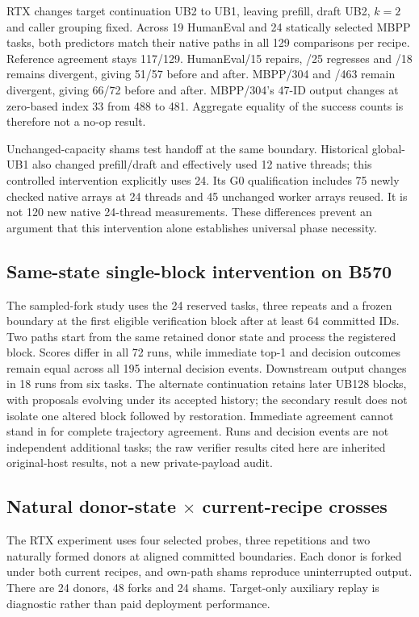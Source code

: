 RTX changes target continuation UB2 to UB1, leaving prefill, draft UB2, $k=2$ and caller grouping fixed. Across 19 HumanEval and 24 statically selected MBPP tasks, both predictors match their native paths in all 129 comparisons per recipe. Reference agreement stays 117/129. HumanEval/15 repairs, /25 regresses and /18 remains divergent, giving 51/57 before and after. MBPP/304 and /463 remain divergent, giving 66/72 before and after. MBPP/304's 47-ID output changes at zero-based index 33 from 488 to 481. Aggregate equality of the success counts is therefore not a no-op result.

Unchanged-capacity shams test handoff at the same boundary. Historical global-UB1 also changed prefill/draft and effectively used 12 native threads; this controlled intervention explicitly uses 24. Its G0 qualification includes 75 newly checked native arrays at 24 threads and 45 unchanged worker arrays reused. It is not 120 new native 24-thread measurements. These differences prevent an argument that this intervention alone establishes universal phase necessity.

\subsection{Same-state single-block intervention on B570}
\label{supp:b570_single_block}
The sampled-fork study uses the 24 reserved tasks, three repeats and a frozen boundary at the first eligible verification block after at least 64 committed IDs. Two paths start from the same retained donor state and process the registered block. Scores differ in all 72 runs, while immediate top-1 and decision outcomes remain equal across all 195 internal decision events. Downstream output changes in 18 runs from six tasks. The alternate continuation retains later UB128 blocks, with proposals evolving under its accepted history; the secondary result does not isolate one altered block followed by restoration. Immediate agreement cannot stand in for complete trajectory agreement. Runs and decision events are not independent additional tasks; the raw verifier results cited here are inherited original-host results, not a new private-payload audit.

\subsection{Natural donor-state \texorpdfstring{$\times$}{x} current-recipe crosses}
\label{supp:natural_crosses}
The RTX experiment uses four selected probes, three repetitions and two naturally formed donors at aligned committed boundaries. Each donor is forked under both current recipes, and own-path shams reproduce uninterrupted output. There are 24 donors, 48 forks and 24 shams. Target-only auxiliary replay is diagnostic rather than paid deployment performance.

